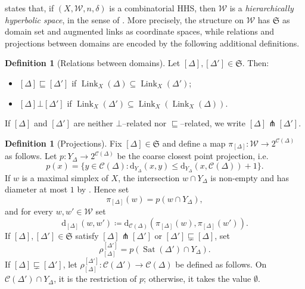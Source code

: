 \documentclass[svgnames]{amsart}
\theoremstyle{plain}
\theoremstyle{definition}
\newtheorem{defn}[thm]{Definition}
\newcommand{\frakS}{\mathfrak S}
\newcommand{\C}[1]{\mathcal{C}(#1)}
\newcommand{\dist}{\mathrm{d}}
\newcommand{\propnest}{\sqsubsetneq}
\newcommand{\orth}{\bot}
\newcommand{\transverse}{\pitchfork}
\newcommand{\nest}{\sqsubseteq}
\newcommand{\link}[2]{\operatorname{Link}_{#1}\left(#2\right)}
\newcommand{\W}{\mathcal{W}}
\newcommand{\Sat}{\operatorname{Sat}}
\begin{document}
\noindent \cite[Theorem 1.18]{BHMS} states that, if $(X,\W,n,\delta)$ is a combinatorial HHS, then $\W$ is a \emph{hierarchically hyperbolic space}, in the sense of \cite[Definition 1.1]{HHS_II}. More precisely, the structure on $\W$ has $\frakS$ as domain set and augmented links as coordinate spaces, while relations and projections between domains are encoded by the following additional definitions.



\begin{defn}[Relations between domains]\label{defn:nest_orth} Let $[\Delta],[\Delta']\in\frakS$. Then:
\begin{itemize}
     \item $[\Delta]\nest[\Delta']$ if $\link{X}{\Delta}\subseteq\link{X}{\Delta'}$;
     \item $[\Delta]\orth[\Delta']$ if $\link{X}{\Delta'}\subseteq \link{X}{\link{X}{\Delta}}$.
\end{itemize}
If $[\Delta]$ and $[\Delta']$ are neither $\orth$--related nor $\nest$--related, we write 
$[\Delta]\transverse[\Delta']$.
\end{defn}














\begin{defn}[Projections]\label{defn:projections}
Fix $[\Delta]\in\frakS$ and define a map $\pi_{[\Delta]}\colon \W\to 2^{\C{\Delta}}$ as follows. Let $p\colon Y_\Delta\to2^{\C{\Delta}}$ be the coarse closest point projection, i.e. 
$$p(x)=\{y\in\C{\Delta}\colon \dist_{Y_\Delta}(x,y)\le\dist_{Y_\Delta}(x,\C{\Delta})+1\}.$$
If $w$ is a maximal simplex of $X$, the intersection $w\cap Y_\Delta$ is non-empty and has diameter at most $1$ by \cite[Lemma 1.15]{BHMS}. Hence set $$\pi_{[\Delta]}(w)=p(w\cap Y_\Delta),$$
and for every $w,w'\in \W$ set $$\dist_{[\Delta]}(w,w')\coloneq\dist_{\C{\Delta}}\left(\pi_{[\Delta]}(w),\pi_{[\Delta]}(w')\right).$$
If $[\Delta],[\Delta']\in\frakS$ satisfy $[\Delta]\transverse[\Delta']$ or $[\Delta']\propnest [\Delta]$, set $$\rho^{[\Delta']}_{[\Delta]}=p(\Sat(\Delta')\cap Y_\Delta).$$ 
If $[\Delta]\propnest [\Delta']$, let $\rho^{[\Delta']}_{[\Delta]}\colon \C{\Delta'}\to \C{\Delta}$ be defined as follows.  On $\C{\Delta'}\cap Y_\Delta$, it is the restriction of $p$; otherwise, it takes the value $\emptyset$.
\end{defn}
\end{document}

